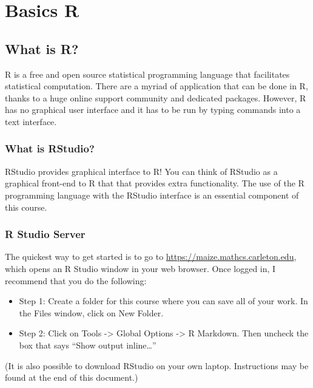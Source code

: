 \documentclass[
]{book}
\providecommand{\tightlist}{%
  \setlength{\itemsep}{0pt}\setlength{\parskip}{0pt}}
\begin{document}
\hypertarget{part-basics-r}{%
\part*{Basics R}\label{part-basics-r}}

\hypertarget{what-is-r}{%
\chapter{What is R?}\label{what-is-r}}

R is a free and open source statistical programming language that facilitates statistical computation. There are a myriad of application that can be done in R, thanks to a huge online support community and dedicated packages. However, R has no graphical user interface and it has to be run by typing commands into a text interface.

\hypertarget{what-is-rstudio}{%
\section{What is RStudio?}\label{what-is-rstudio}}

RStudio provides graphical interface to R! You can think of RStudio as a graphical front-end to R that that provides extra functionality. The use of the R programming language with the RStudio interface is an essential component of this course.

\hypertarget{r-studio-server}{%
\section{R Studio Server}\label{r-studio-server}}

The quickest way to get started is to go to \url{https://maize.mathcs.carleton.edu}, which opens an R Studio window in your web browser. Once logged in, I recommend that you do the following:

\begin{itemize}
\tightlist
\item
  Step 1: Create a folder for this course where you can save all of your work. In the Files window, click on New Folder.
\item
  Step 2: Click on Tools -\textgreater{} Global Options -\textgreater{} R Markdown. Then uncheck the box that says ``Show output inline\ldots{}''
\end{itemize}

(It is also possible to download RStudio on your own laptop. Instructions may be found at the end of this document.)
\end{document}
